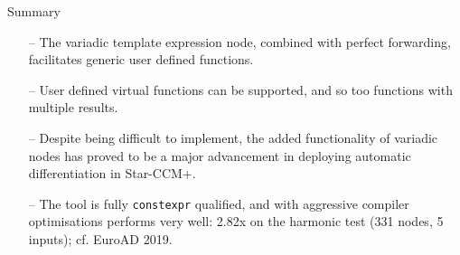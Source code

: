 \documentclass[xcolor=dvipsnames]{beamer}
\begin{document}
\begin{frame}[fragile]{Summary}
\begin{itemize}
\item[--] The variadic template expression node, combined with perfect forwarding, facilitates generic user defined functions. \vspace{3mm}
\item[--] User defined virtual functions can be supported, and so too functions with multiple results. \vspace{3mm}
\item[--] Despite being difficult to implement, the added functionality of variadic nodes has proved to be a major advancement in deploying automatic differentiation in Star-CCM+.  \vspace{3mm}
\item[--] The tool is fully \texttt{constexpr} qualified, and with aggressive compiler optimisations performs very well: 2.82x on the harmonic test (331 nodes, 5 inputs); cf. EuroAD 2019. \vspace{3mm}
\end{itemize}
\end{frame}


\begin{frame}[plain]
  \titlepage
\end{frame}
\end{document}
